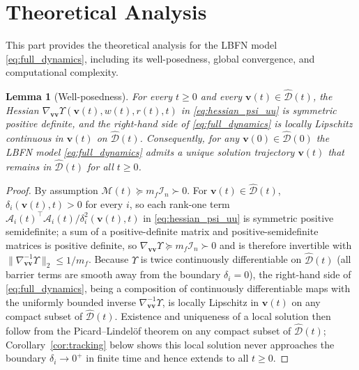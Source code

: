 \documentclass[fleqn,10pt]{wlscirep}
\newtheorem{lemma}{Lemma}
\begin{document}
\section{Theoretical Analysis}
This part provides the theoretical analysis for the LBFN model \eqref{eq:full_dynamics}, including its well-posedness, global convergence, and computational complexity.

\begin{lemma}[Well-posedness]\label{lem:wellposed}
For every $t\geq0$ and every $\bm{v}(t)\in\widehat{\mathcal{D}}(t)$, the Hessian $\nabla_{\bm{vv}}\Upsilon(\bm{v}(t),w(t),r(t),t)$ in \eqref{eq:hessian_psi_uu} is symmetric positive definite, and the right-hand side of \eqref{eq:full_dynamics} is locally Lipschitz continuous in $\bm{v}(t)$ on $\widehat{\mathcal{D}}(t)$. Consequently, for any $\bm{v}(0)\in\widehat{\mathcal{D}}(0)$ the LBFN model \eqref{eq:full_dynamics} admits a unique solution trajectory $\bm{v}(t)$ that remains in $\widehat{\mathcal{D}}(t)$ for all $t\geq0$.
\end{lemma}
\begin{proof}
By assumption $\mathcal{M}(t)\succeq m_f\mathcal{I}_n\succ0$. For $\bm{v}(t)\in\widehat{\mathcal{D}}(t)$, $\delta_i(\bm{v}(t),t)>0$ for every $i$, so each rank-one term $\mathcal{A}_i(t)^\top\mathcal{A}_i(t)/\delta_i^2(\bm{v}(t),t)$ in \eqref{eq:hessian_psi_uu} is symmetric positive semidefinite; a sum of a positive-definite matrix and positive-semidefinite matrices is positive definite, so $\nabla_{\bm{vv}}\Upsilon\succeq m_f\mathcal{I}_n\succ0$ and is therefore invertible with $\|\nabla_{\bm{vv}}^{-1}\Upsilon\|_2\leq1/m_f$. Because $\Upsilon$ is twice continuously differentiable on $\widehat{\mathcal{D}}(t)$ (all barrier terms are smooth away from the boundary $\delta_i=0$), the right-hand side of \eqref{eq:full_dynamics}, being a composition of continuously differentiable maps with the uniformly bounded inverse $\nabla_{\bm{vv}}^{-1}\Upsilon$, is locally Lipschitz in $\bm{v}(t)$ on any compact subset of $\widehat{\mathcal{D}}(t)$. Existence and uniqueness of a local solution then follow from the Picard--Lindel\"of theorem on any compact subset of $\widehat{\mathcal{D}}(t)$; Corollary~\ref{cor:tracking} below shows this local solution never approaches the boundary $\delta_i\to0^+$ in finite time and hence extends to all $t\geq0$.
\end{proof}
\end{document}
